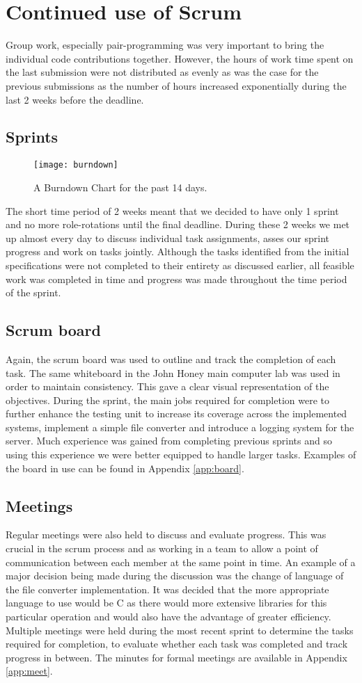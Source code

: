 \section{Continued use of Scrum}
Group work, especially pair-programming was very important to bring the individual code contributions together. However, the hours of work time spent on the last submission were not distributed as evenly as was the case for the previous submissions as the number of hours increased exponentially during the last 2 weeks before the deadline.
\subsection{Sprints}

\begin{figure}[h]
	\centering
	\texttt{[image: burndown]}
	\caption{A Burndown Chart for the past 14 days.}\label{fig:burn}
\end{figure}
The short time period of 2 weeks meant that we decided to have only 1 sprint and no more role-rotations until the final deadline. During these 2 weeks we met up almost every day to discuss individual task assignments, asses our sprint progress and work on tasks jointly. Although the tasks identified from the initial specifications were not completed to their entirety as discussed earlier, all feasible work was completed in time and progress was made throughout the time period of the sprint.
\subsection{Scrum board}
Again, the scrum board was used to outline and track the completion of each task. The same whiteboard in the John Honey main computer lab was used in order to maintain consistency. This gave a clear visual representation of the objectives. During the sprint, the main jobs required for completion were to further enhance the testing unit to increase its coverage across the implemented systems, implement a simple file converter and introduce a logging system for the server. Much experience was gained from completing previous sprints and so using this experience we were better equipped to handle larger tasks. Examples of the board in use can be found in Appendix \ref{app:board}.

\subsection{Meetings}
Regular meetings were also held to discuss and evaluate progress. This was crucial in the scrum process and as working in a team to allow a point of communication between each member at the same point in time. An example of a major decision being made during the discussion was the change of language of the file converter implementation. It was decided that the more appropriate language to use would be C as there would more extensive libraries for this particular operation and would also have the advantage of greater efficiency. Multiple meetings were held during the most recent sprint to determine the tasks required for completion, to evaluate whether each task was completed and track progress in between.
The minutes for formal meetings are available in Appendix \ref{app:meet}.

